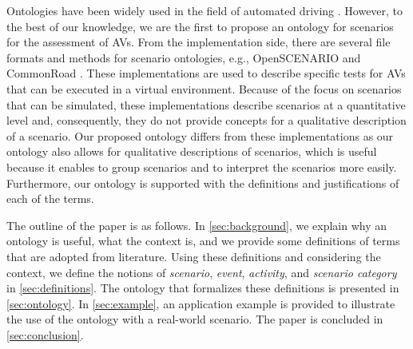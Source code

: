 Ontologies have been widely used in the field of automated driving \autocite{provine2004ontology, morignot2013ontology, schlenoff2003using, zhao2015core, maiti2017conceptualization, benvenuti2017ontologybased, bagschik2017ontology}. However, to the best of our knowledge, we are the first to propose an ontology for scenarios for the assessment of AVs. 
From the implementation side, there are several file formats and methods for scenario ontologies, e.g., OpenSCENARIO \autocite{openscenario} and CommonRoad \autocite{althoff2017CommonRoad}. 
\cstart These implementations are used to describe specific tests for AVs that can be executed in a virtual environment.
Because of the focus on scenarios that can be simulated, these implementations describe scenarios at a quantitative level and, consequently, they do not provide concepts for a qualitative description of a scenario. \cend
Our proposed ontology differs from these implementations as our ontology also allows for qualitative descriptions of scenarios, which is useful because it enables to group scenarios and to interpret the scenarios more easily.
Furthermore, our ontology is supported with the definitions and justifications of each of the terms.

The outline of the paper is as follows. In \cref{sec:background}, we explain why an ontology is useful, what the context is, and we provide some definitions of terms that are adopted from literature. 
Using these definitions and considering the context, we define the notions of \emph{scenario}, \emph{event}, \emph{activity}, and \emph{scenario category}  in \cref{sec:definitions}. 
The ontology that formalizes these definitions is presented in \cref{sec:ontology}. 
In \cref{sec:example}, an application example is provided to illustrate the use of the ontology with a real-world scenario. 
The paper is concluded in \cref{sec:conclusion}.
